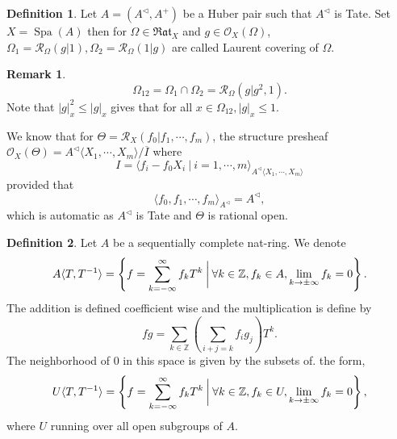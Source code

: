 \documentclass[10pt]{article}
\numberwithin{equation}{section}
\theoremstyle{definition}
\newtheorem{definition}{Definition}[subsection]
\newtheorem{remark}{Remark}[subsection]
\DeclareMathOperator{\Spa}{Spa}
\newcommand{\Z}[0]{\mathbb{Z}}
\newcommand{\cR}[0]{\mathcal{R}}
\newcommand{\sep}[0]{\:|\:}
\newcommand{\ab}[1]{\vert #1 \vert}
\newcommand{\cO}[0]{\mathcal{O}}
\newcommand{\Rat}[0]{\mathfrak{Rat}}
\begin{document}
\begin{definition}
  Let $A=(A^\triangleleft,A^+)$ be a Huber pair such that $A^\triangleleft$ is Tate. Set $X=\Spa(A)$ then for $\Omega\in\Rat_X$ and $g\in\cO_X(\Omega)$, $\Omega_1 = \cR_\Omega(g|1),\Omega_2 = \cR_\Omega(1|g)$ are called Laurent covering of $\Omega$.
\end{definition}
\begin{remark}
  \begin{equation*}
  \Omega_{12} = \Omega_1\cap \Omega_2 = \cR_\Omega(g|g^2,1). 
\end{equation*}
Note that $\ab{g}_x^2\leq \ab{g}_x$ gives that for all $x\in\Omega_{12},\ab{g}_x\leq 1$.
\end{remark}
We know that for $\Theta=\cR_X(f_0|f_1,\cdots,f_m)$, the structure presheaf $\cO_X(\Theta) = A^\triangleleft\langle X_1,\cdots,X_m\rangle/\overline{I}$ where 
\begin{equation*}
  I = \langle f_i-f_0X_i\sep i=1,\cdots,m\rangle_{A^\triangleleft\langle X_1,\cdots,X_m\rangle}
\end{equation*}
provided that 
\begin{equation*}
  \langle f_0,f_1,\cdots,f_m\rangle_{A^\triangleleft}= A^\triangleleft,
\end{equation*}
which is automatic as $A^\triangleleft$ is Tate and $\Theta$ is rational open.

\begin{definition}
    \label{definition_25_1}
 Let $A$ be a sequentially complete nat-ring.  We denote 
 \begin{equation*}
    A\langle T,T^{-1}\rangle = \left\{f = \sum_{k=-\infty}^\infty f_kT^k \:\bigg{\vert}\: \forall k\in\Z, f_k\in A,\lim_{k\to\pm\infty}f_k=0\right\}.
 \end{equation*}
 The addition is defined coefficient wise and the multiplication is define by 
 \begin{equation*}
    fg = \sum_{k\in\Z}\left(\sum_{i+j=k}f_ig_j\right)T^k.
 \end{equation*}
 The neighborhood of $0$ in this space is given by the subsets of. the form,
 \begin{equation*}
    U\langle T,T^{-1}\rangle = \left\{f = \sum_{k=-\infty}^\infty f_kT^k \:\bigg{\vert}\: \forall k\in\Z, f_k\in U,\lim_{k\to\pm\infty}f_k=0\right\},
 \end{equation*}
 where $U$ running over all open subgroups of $A$.
\end{definition}
\end{document}
